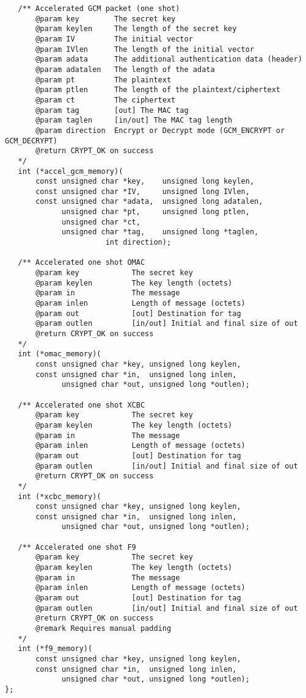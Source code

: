 \documentclass[synpaper]{book}
\begin{document}
\begin{small}
\begin{verbatim}
   /** Accelerated GCM packet (one shot)
       @param key        The secret key
       @param keylen     The length of the secret key
       @param IV         The initial vector
       @param IVlen      The length of the initial vector
       @param adata      The additional authentication data (header)
       @param adatalen   The length of the adata
       @param pt         The plaintext
       @param ptlen      The length of the plaintext/ciphertext
       @param ct         The ciphertext
       @param tag        [out] The MAC tag
       @param taglen     [in/out] The MAC tag length
       @param direction  Encrypt or Decrypt mode (GCM_ENCRYPT or GCM_DECRYPT)
       @return CRYPT_OK on success
   */
   int (*accel_gcm_memory)(
       const unsigned char *key,    unsigned long keylen,
       const unsigned char *IV,     unsigned long IVlen,
       const unsigned char *adata,  unsigned long adatalen,
             unsigned char *pt,     unsigned long ptlen,
             unsigned char *ct,
             unsigned char *tag,    unsigned long *taglen,
                       int direction);

   /** Accelerated one shot OMAC
       @param key            The secret key
       @param keylen         The key length (octets)
       @param in             The message
       @param inlen          Length of message (octets)
       @param out            [out] Destination for tag
       @param outlen         [in/out] Initial and final size of out
       @return CRYPT_OK on success
   */
   int (*omac_memory)(
       const unsigned char *key, unsigned long keylen,
       const unsigned char *in,  unsigned long inlen,
             unsigned char *out, unsigned long *outlen);

   /** Accelerated one shot XCBC
       @param key            The secret key
       @param keylen         The key length (octets)
       @param in             The message
       @param inlen          Length of message (octets)
       @param out            [out] Destination for tag
       @param outlen         [in/out] Initial and final size of out
       @return CRYPT_OK on success
   */
   int (*xcbc_memory)(
       const unsigned char *key, unsigned long keylen,
       const unsigned char *in,  unsigned long inlen,
             unsigned char *out, unsigned long *outlen);

   /** Accelerated one shot F9
       @param key            The secret key
       @param keylen         The key length (octets)
       @param in             The message
       @param inlen          Length of message (octets)
       @param out            [out] Destination for tag
       @param outlen         [in/out] Initial and final size of out
       @return CRYPT_OK on success
       @remark Requires manual padding
   */
   int (*f9_memory)(
       const unsigned char *key, unsigned long keylen,
       const unsigned char *in,  unsigned long inlen,
             unsigned char *out, unsigned long *outlen);
};
\end{verbatim}
\end{small}
\end{document}
